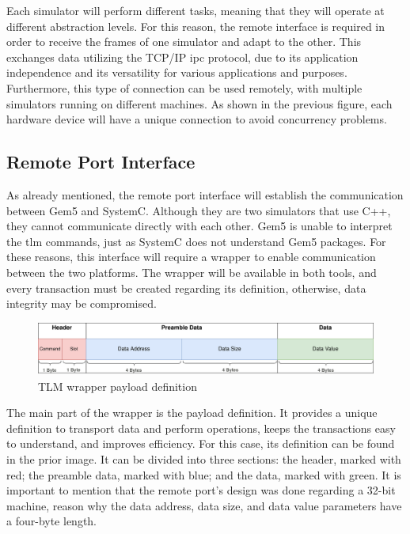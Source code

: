 Each simulator will perform different tasks, meaning that they will operate at different abstraction levels. For this reason, the remote interface is 
required in order to receive the frames of one simulator and adapt to the other.  
This exchanges data utilizing the TCP/IP \gls{ipc} protocol, due to its application independence and its versatility for various applications 
and purposes. Furthermore, this type of connection can be used remotely, with multiple simulators running on different machines.  
As shown in the previous figure, each hardware device will have a unique connection to avoid concurrency problems. 

\subsection{Remote Port Interface} 
\label{subsec::TLMwrapper}

As already mentioned, the remote port interface will establish the communication between Gem5 and SystemC.
Although they are two simulators that use C++, they cannot communicate directly with each other. Gem5 is unable to 
interpret the \gls{tlm} commands, just as SystemC does not understand Gem5 packages. For these reasons,
this interface will require a wrapper to enable communication between the two platforms. 
The wrapper will be available in both tools, and every transaction must be created regarding its definition, otherwise, 
data integrity may be compromised. 

\begin{figure}[H]
	\centering
 	\includegraphics[width=0.8\linewidth]{Images/TLM_Wrapper_Payload.png} 
 	\caption{TLM wrapper payload definition}
\end{figure}


The main part of the wrapper is the payload definition. It provides a unique definition to transport data and perform operations, 
keeps the transactions easy to understand, and improves efficiency. For this case, its definition can be found in the prior image. 
It can be divided into three sections: the header, marked with red; the preamble data, marked with blue; and the data, marked with green. 
It is important to mention that the remote port's design was done regarding a 32-bit machine, reason why the data address, data size, and data value 
parameters have a four-byte length.

